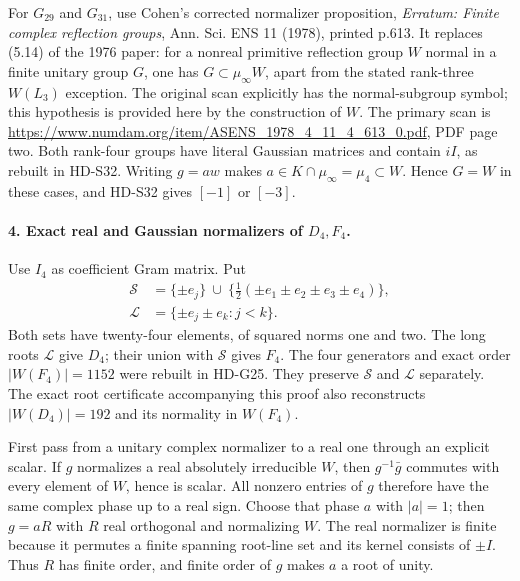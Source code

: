 For \(G_{29}\) and \(G_{31}\), use Cohen's corrected normalizer
proposition, \emph{Erratum: Finite complex reflection groups},
Ann. Sci. ENS 11 (1978), printed p.613. It replaces (5.14) of the
1976 paper: for a nonreal primitive reflection group \(W\) normal
in a finite unitary group \(G\), one has \(G\subset\mu_\infty W\),
apart from the stated rank-three \(W(L_3)\) exception. The original
scan explicitly has the normal-subgroup symbol; this hypothesis is
provided here by the construction of \(W\). The primary scan is
\url{https://www.numdam.org/item/ASENS_1978_4_11_4_613_0.pdf},
PDF page two. Both rank-four groups have literal Gaussian matrices
and contain \(iI\), as rebuilt in HD-S32. Writing \(g=aw\) makes
\(a\in K\cap\mu_\infty=\mu_4\subset W\). Hence \(G=W\)
in these cases, and HD-S32 gives \([-1]\) or \([-3]\).

\paragraph{4. Exact real and Gaussian normalizers of \(D_4,F_4\).}
Use \(I_4\) as coefficient Gram matrix. Put
\[
\begin{split}
 \mathcal S&=\{\pm e_j\}\ \cup\
       \{\tfrac12(\pm e_1\pm e_2\pm e_3\pm e_4)\},\\
 \mathcal L&=\{\pm e_j\pm e_k:j<k\}.
\end{split}
\]
Both sets have twenty-four elements, of squared norms one and two.
The long roots \(\mathcal L\) give \(D_4\); their union with
\(\mathcal S\) gives \(F_4\). The four generators and exact
order \(|W(F_4)|=1152\) were rebuilt in HD-G25. They preserve
\(\mathcal S\) and \(\mathcal L\) separately. The exact root
certificate accompanying this proof also reconstructs
\(|W(D_4)|=192\) and its normality in \(W(F_4)\).

First pass from a unitary complex normalizer to a real one through
an explicit scalar. If \(g\) normalizes a real absolutely irreducible
\(W\), then \(g^{-1}\bar g\) commutes with every element of
\(W\), hence is scalar. All nonzero entries of \(g\) therefore
have the same complex phase up to a real sign. Choose that phase
\(a\) with \(|a|=1\); then \(g=aR\) with \(R\) real orthogonal
and normalizing \(W\). The real normalizer is finite because it
permutes a finite spanning root-line set and its kernel consists of
\(\pm I\). Thus \(R\) has finite order, and finite order of
\(g\) makes \(a\) a root of unity.

